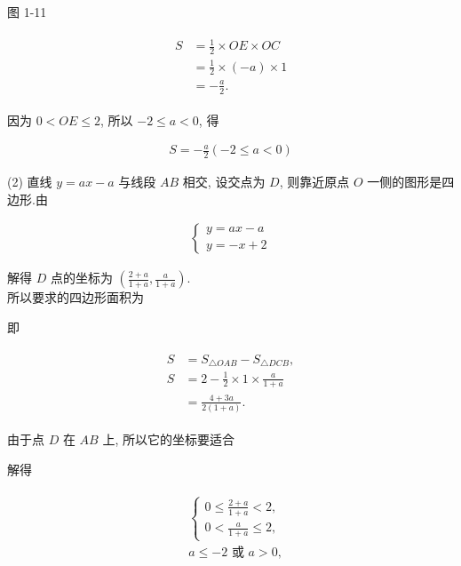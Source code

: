 \documentclass[10pt]{article}
\begin{document}
图 1-11

\begin{align*}
\begin{aligned}
S & =\frac{1}{2} \times O E \times O C \\
& =\frac{1}{2} \times(-a) \times 1 \\
& =-\frac{a}{2} .
\end{aligned}
\end{align*}

因为 $0<O E \leqslant 2$, 所以 $-2 \leqslant a<0$, 得

\begin{align*}
S=-\frac{a}{2}(-2 \leqslant a<0)
\end{align*}

(2) 直线 $y=a x-a$ 与线段 $A B$ 相交, 设交点为 $D$, 则靠近原点 $O$ 一侧的图形是四边形.由

\begin{align*}
\left\{\begin{array}{l}
y=a x-a \\
y=-x+2
\end{array}\right.
\end{align*}

解得 $D$ 点的坐标为 $\left(\frac{2+a}{1+a}, \frac{a}{1+a}\right)$.\\
所以要求的四边形面积为

即

\begin{align*}
\begin{aligned}
S & =S_{\triangle O A B}-S_{\triangle D C B}, \\
S & =2-\frac{1}{2} \times 1 \times \frac{a}{1+a} \\
& =\frac{4+3 a}{2(1+a)} .
\end{aligned}
\end{align*}

由于点 $D$ 在 $A B$ 上, 所以它的坐标要适合

解得

\begin{align*}
\begin{aligned}
& \left\{\begin{array}{l}
0 \leqslant \frac{2+a}{1+a}<2, \\
0<\frac{a}{1+a} \leqslant 2,
\end{array}\right. \\
& a \leqslant-2 \text { 或 } a>0,
\end{aligned}
\end{align*}
\end{document}
